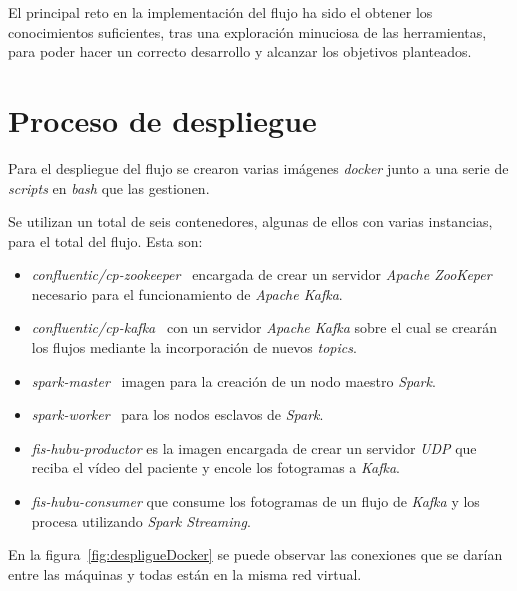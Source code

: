 El principal reto en la implementación del flujo ha sido el obtener los conocimientos suficientes, tras una exploración minuciosa de las herramientas, para poder hacer un correcto desarrollo y alcanzar los objetivos planteados.


\section{Proceso de despliegue}

Para el despliegue del flujo se crearon varias imágenes \textit{docker} junto a una serie de \textit{scripts} en \textit{bash} que las gestionen.

Se utilizan un total de seis contenedores, algunas de ellos con varias instancias, para el total del flujo. Esta son:

\begin{itemize}
	\item \textit{confluentic/cp-zookeeper}~\cite{confluentic2020docker} encargada de crear un servidor \textit{Apache ZooKeper} necesario para el funcionamiento de \textit{Apache Kafka}.
	\item \textit{confluentic/cp-kafka}~\cite{confluentic2020docker} con un servidor \textit{Apache Kafka} sobre el cual se crearán los flujos mediante la incorporación de nuevos \textit{topics}.
	\item \textit{spark-master}~\cite{juez2019docker} imagen para la creación de un nodo maestro \textit{Spark}.
	\item \textit{spark-worker}~\cite{juez2019docker} para los nodos esclavos de \textit{Spark}.
	\item \textit{fis-hubu-productor} es la imagen encargada de crear un servidor \textit{UDP} que reciba el vídeo del paciente y encole los fotogramas a \textit{Kafka}.
	\item \textit{fis-hubu-consumer} que consume los fotogramas de un flujo de \textit{Kafka} y los procesa utilizando \textit{Spark Streaming}.
\end{itemize}

En la figura~\ref{fig:despligueDocker} se puede observar las conexiones que se darían entre las máquinas y todas están en la misma red virtual.

